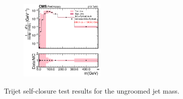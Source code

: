 \begin{figure}[htp!]
\begin{subfigure}
          \centering
          \includegraphics[width=0.45\textwidth]{figures/multijet/unfolding/trijet/closure_binnedResult_ungroomed_3.pdf}
        \end{subfigure}
        \caption{Trijet self-closure test results for the ungroomed jet mass.}
	\label{fig:trijetclosurebinned_u}
      \end{figure}

